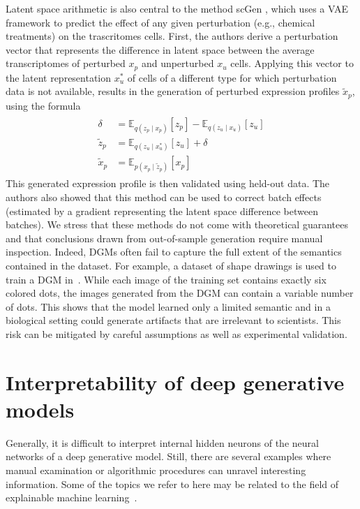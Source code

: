 Latent space arithmetic is also central to the method scGen \cite{Lotfollahi2018}, which uses a VAE framework to predict the effect of any given perturbation (e.g., chemical treatments) on the trascritomes cells. First, the authors derive a perturbation vector that represents the difference in latent space between the average transcriptomes of perturbed $x_p$ and unperturbed $x_u$ cells. Applying this vector to the latent representation $x^*_u$ of cells of a different type for which perturbation data is not available, results in the generation of perturbed expression profiles $\tilde{x}_p$, using the formula
\begin{align}
\begin{split}
    \delta &= \mathbb{E}_{q(z_p \mid x_p)}[z_p] - \mathbb{E}_{q(z_u \mid x_u)}[z_u]\\
    \tilde{z}_p &=  \mathbb{E}_{q(z_u \mid x^*_u)}[z_u] + \delta \\
    \tilde{x}_p &= \mathbb{E}_{p(x_p \mid \tilde{z}_p)}[x_p]
\end{split}
\end{align}
This generated expression profile is then validated using held-out data. The authors also showed that this method can be used to correct batch effects (estimated by a gradient representing the latent space difference between batches). We stress that these methods do not come with theoretical guarantees and that conclusions drawn from out-of-sample generation require manual inspection. Indeed, DGMs often fail to capture the full extent of the semantics contained in the dataset. For example, a dataset of shape drawings is used to train a DGM in~\cite{Zhao2018}. While each image of the training set contains exactly six colored dots, the images generated from the DGM can contain a variable number of dots. This shows that the model learned only a limited semantic and in a biological setting could generate artifacts that are irrelevant to scientists. This risk can be mitigated by careful assumptions as well as experimental validation. 


\section{Interpretability of deep generative models}

Generally, it is difficult to interpret internal hidden neurons of the neural networks of a deep generative model. Still, there are several examples where manual examination or algorithmic procedures can unravel interesting information. Some of the topics we refer to here may be related to the field of explainable machine learning~\cite{gilpin2018explaining}.

